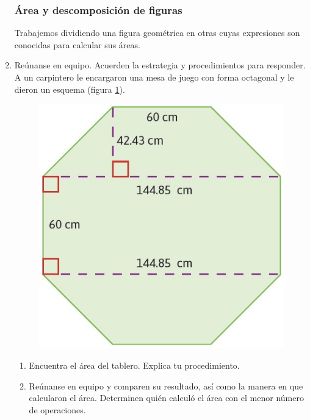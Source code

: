 \documentclass[11pt]{book}
\begin{document}
\begin{enumerate}
        \subsubsection{Área y descomposición de figuras}

        Trabajemos dividiendo una figura geométrica en otras cuyas expresiones son conocidas para calcular sus áreas.

  \item Reúnanse en equipo. Acuerden la estrategia y procedimientos para responder.
        A un carpintero le encargaron una mesa de juego con forma octagonal y le dieron un esquema (figura \ref{fig:06}).

        \begin{minipage}[t]{0.35\textwidth}
          \begin{figure}[H]
            \centering
            \includegraphics[width=\linewidth]{06.jpg}
            \label{fig:06}
          \end{figure}
        \end{minipage}\hfill
        \begin{minipage}[t]{0.55\textwidth}
          \begin{enumerate}
            \item Encuentra el área del tablero. Explica tu procedimiento.
            \item Reúnanse en equipo y comparen su resultado, así como la manera en que calcularon el área. Determinen quién calculó el área con el menor número de operaciones.
          \end{enumerate}
        \end{minipage}


\end{enumerate}
\end{document}
